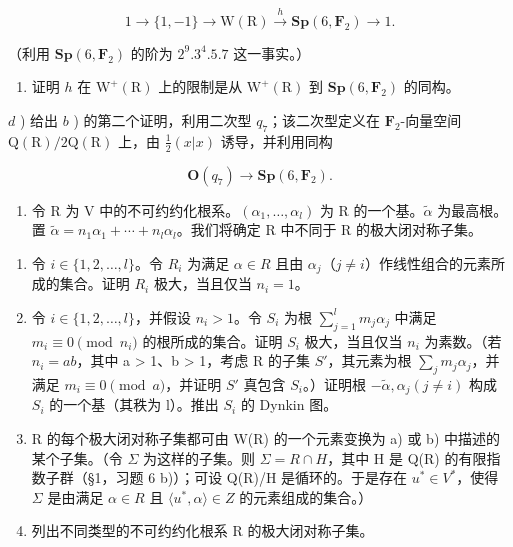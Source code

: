 \[
1 \rightarrow \{1, - 1 \} \rightarrow \mathrm{W} (\mathrm{R}) \xrightarrow {h} \mathbf {S p} (6, \mathbf {F} _ {2}) \rightarrow 1.
\]

（利用 \(\mathbf{Sp}(6,\mathbf{F}_2)\) 的阶为 \(2^{9}.3^{4}.5.7\) 这一事实。）

\begin{enumerate}
\def\labelenumi{\alph{enumi})}
\setcounter{enumi}{2}
\tightlist
\item
  证明 \(h\) 在 \(\mathrm{W}^{+}(\mathrm{R})\) 上的限制是从 \(\mathrm{W}^{+}(\mathrm{R})\) 到 \(\mathbf{Sp}(6, \mathbf{F}_2)\) 的同构。
\end{enumerate}

\(d\) ) 给出 \(b\) ) 的第二个证明，利用二次型 \(q_{7}\)；该二次型定义在 \(\mathbf{F}_2\)-向量空间 \(\mathrm{Q(R) / 2Q(R)}\) 上，由 \(\frac{1}{2} (x|x)\) 诱导，并利用同构

\[
\mathbf {O} (q _ {7}) \rightarrow \mathbf {S p} (6, \mathbf {F} _ {2}).
\]

\begin{enumerate}
\def\labelenumi{\arabic{enumi})}
\setcounter{enumi}{3}
\tightlist
\item
  令 R 为 V 中的不可约约化根系。\((\alpha_{1},\ldots,\alpha_{l})\) 为 R 的一个基。\(\tilde{\alpha}\) 为最高根。置 \(\tilde{\alpha}=n_{1}\alpha_{1}+\cdots+n_{l}\alpha_{l}\)。我们将确定 R 中不同于 R 的极大闭对称子集。
\end{enumerate}

\begin{enumerate}
\def\labelenumi{\alph{enumi})}
\item
  令 \(i \in \{1, 2, \ldots, l\}\)。令 \(R_i\) 为满足 \(\alpha \in R\) 且由 \(\alpha_j\)（\(j \neq i\)）作线性组合的元素所成的集合。证明 \(R_i\) 极大，当且仅当 \(n_i = 1\)。
\item
  令 \(i \in \{1, 2, \ldots, l\}\)，并假设 \(n_i > 1\)。令 \(S_i\) 为根 \(\sum_{j=1}^{l} m_j \alpha_j\) 中满足 \(m_i \equiv 0 \pmod{n_i}\) 的根所成的集合。证明 \(S_i\) 极大，当且仅当 \(n_i\) 为素数。（若 \(n_i = ab\)，其中 a \textgreater{} 1、b \textgreater{} 1，考虑 R 的子集 \(S'\)，其元素为根 \(\sum_{j} m_j \alpha_j\)，并满足 \(m_i \equiv 0 \pmod{a}\)，并证明 \(S'\) 真包含 \(S_i\)。）证明根 \(-\tilde{\alpha}, \alpha_j (j \neq i)\) 构成 \(S_i\) 的一个基（其秩为 l）。推出 \(S_i\) 的 Dynkin 图。
\item
  R 的每个极大闭对称子集都可由 W(R) 的一个元素变换为 a) 或 b) 中描述的某个子集。（令 \(\Sigma\) 为这样的子集。则 \(\Sigma = R \cap H\)，其中 H 是 Q(R) 的有限指数子群（§1，习题 6 b)）；可设 Q(R)/H 是循环的。于是存在 \(u^{*} \in V^{*}\)，使得 \(\Sigma\) 是由满足 \(\alpha \in R\) 且 \(\langle u^{*}, \alpha \rangle \in Z\) 的元素组成的集合。）
\item
  列出不同类型的不可约约化根系 R 的极大闭对称子集。
\end{enumerate}

